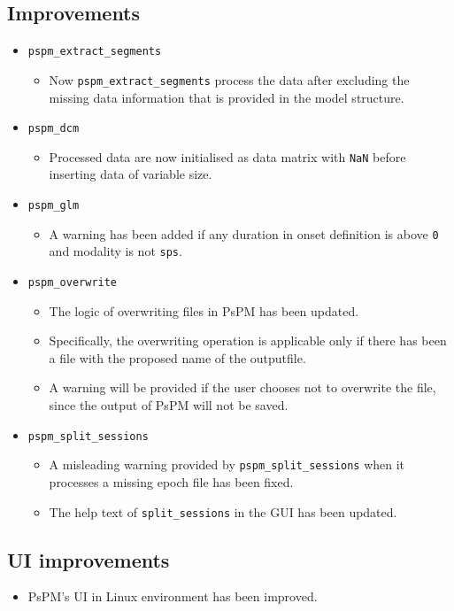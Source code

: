 \documentclass[english]{article}
\numberwithin{equation}{section}
\numberwithin{figure}{section}
\begin{document}
\subsection*{Improvements}
\begin{itemize}
\item \texttt{pspm\_extract\_segments}
\begin{itemize}
\item Now \texttt{pspm\_extract\_segments} process the data after excluding
the missing data information that is provided in the model structure.
\end{itemize}
\item \texttt{pspm\_dcm}
\begin{itemize}
\item Processed data are now initialised as data matrix with \texttt{NaN}
before inserting data of variable size.
\end{itemize}
\item \texttt{pspm\_glm}
\begin{itemize}
\item A warning has been added if any duration in onset definition is above
\texttt{0} and modality is not \texttt{sps}.
\end{itemize}
\item \texttt{pspm\_overwrite}
\begin{itemize}
\item The logic of overwriting files in PsPM has been updated.
\item Specifically, the overwriting operation is applicable only if there
has been a file with the proposed name of the outputfile.
\item A warning will be provided if the user chooses not to overwrite the
file, since the output of PsPM will not be saved. 
\end{itemize}
\item \texttt{pspm\_split\_sessions}
\begin{itemize}
\item A misleading warning provided by \texttt{pspm\_split\_sessions} when
it processes a missing epoch file has been fixed.
\item The help text of \texttt{split\_sessions} in the GUI has been updated.
\end{itemize}
\end{itemize}

\subsection*{UI improvements}
\begin{itemize}
\item PsPM's UI in Linux environment has been improved.
\end{itemize}
\end{document}
